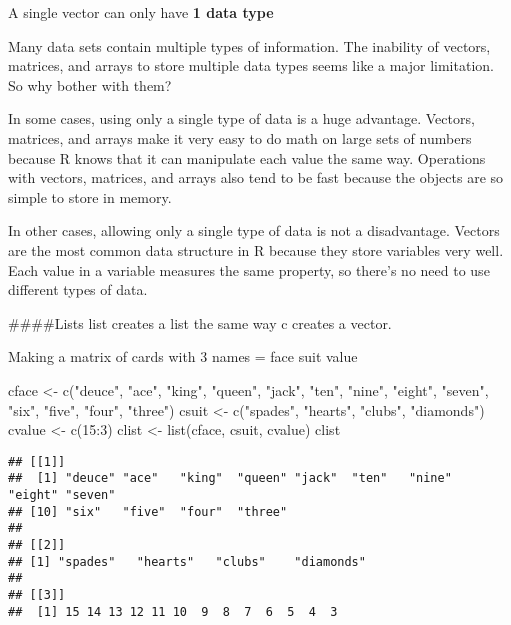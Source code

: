 \documentclass[
]{article}
\newenvironment{Shaded}{\begin{snugshade}}{\end{snugshade}}
\newcommand{\DecValTok}[1]{\textcolor[rgb]{0.00,0.00,0.81}{#1}}
\newcommand{\FunctionTok}[1]{\textcolor[rgb]{0.00,0.00,0.00}{#1}}
\newcommand{\NormalTok}[1]{#1}
\newcommand{\OtherTok}[1]{\textcolor[rgb]{0.56,0.35,0.01}{#1}}
\newcommand{\SpecialCharTok}[1]{\textcolor[rgb]{0.00,0.00,0.00}{#1}}
\newcommand{\StringTok}[1]{\textcolor[rgb]{0.31,0.60,0.02}{#1}}
\begin{document}
A single vector can only have \textbf{1 data type}

Many data sets contain multiple types of information. The inability of
vectors, matrices, and arrays to store multiple data types seems like a
major limitation. So why bother with them?

In some cases, using only a single type of data is a huge advantage.
Vectors, matrices, and arrays make it very easy to do math on large sets
of numbers because R knows that it can manipulate each value the same
way. Operations with vectors, matrices, and arrays also tend to be fast
because the objects are so simple to store in memory.

In other cases, allowing only a single type of data is not a
disadvantage. Vectors are the most common data structure in R because
they store variables very well. Each value in a variable measures the
same property, so there's no need to use different types of data.

\#\#\#\#Lists list creates a list the same way c creates a vector.

Making a matrix of cards with 3 names = face suit value

\begin{Shaded}
\begin{Highlighting}[]
\NormalTok{cface }\OtherTok{\textless{}{-}} \FunctionTok{c}\NormalTok{(}\StringTok{"deuce"}\NormalTok{, }\StringTok{"ace"}\NormalTok{, }\StringTok{"king"}\NormalTok{, }\StringTok{"queen"}\NormalTok{, }\StringTok{"jack"}\NormalTok{, }\StringTok{"ten"}\NormalTok{, }\StringTok{"nine"}\NormalTok{, }\StringTok{"eight"}\NormalTok{, }\StringTok{"seven"}\NormalTok{, }\StringTok{"six"}\NormalTok{, }\StringTok{"five"}\NormalTok{, }\StringTok{"four"}\NormalTok{, }\StringTok{"three"}\NormalTok{)}
\NormalTok{csuit }\OtherTok{\textless{}{-}} \FunctionTok{c}\NormalTok{(}\StringTok{"spades"}\NormalTok{, }\StringTok{"hearts"}\NormalTok{, }\StringTok{"clubs"}\NormalTok{, }\StringTok{"diamonds"}\NormalTok{)}
\NormalTok{cvalue }\OtherTok{\textless{}{-}} \FunctionTok{c}\NormalTok{(}\DecValTok{15}\SpecialCharTok{:}\DecValTok{3}\NormalTok{)}
\NormalTok{clist }\OtherTok{\textless{}{-}} \FunctionTok{list}\NormalTok{(cface, csuit, cvalue)}
\NormalTok{clist}
\end{Highlighting}
\end{Shaded}

\begin{verbatim}
## [[1]]
##  [1] "deuce" "ace"   "king"  "queen" "jack"  "ten"   "nine"  "eight" "seven"
## [10] "six"   "five"  "four"  "three"
## 
## [[2]]
## [1] "spades"   "hearts"   "clubs"    "diamonds"
## 
## [[3]]
##  [1] 15 14 13 12 11 10  9  8  7  6  5  4  3
\end{verbatim}
\end{document}
